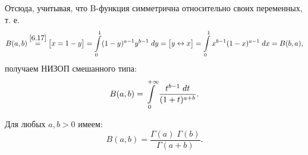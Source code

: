 Отсюда, учитывая, что B-функция симметрична относительно своих переменных, т. е.
\begin{equation*}
    B(a, b) \overset{\eqref{6.17}}{=} \left[\begin{matrix}x = 1-y\end{matrix}\right] =
    \displaystyle\int\limits_0^1 (1-y)^{a-1} y^{b-1} \; dy =
    \left[\begin{matrix}y \leftrightarrow x\end{matrix}\right] =
    \displaystyle\int\limits_0^1 x^{b-1} (1-x)^{a-1} \; dx
    = B(b,a) ,
\end{equation*}
получаем НИЗОП смешанного типа:
\begin{equation}
    \label{6.19}
    B(a,b) = \displaystyle\int\limits_0^{+\infty} \dfrac{t^{b-1} \; dt}{(1+t)^{a+b}}.
\end{equation}

\begin{theorem}
    Для любых $ a, b > 0 $ имеем:
    \begin{equation}
        \label{6.20}
        B(a, b) = \dfrac{\Gamma(a) \; \Gamma(b)}{\Gamma (a + b)}.
    \end{equation}
\end{theorem}
